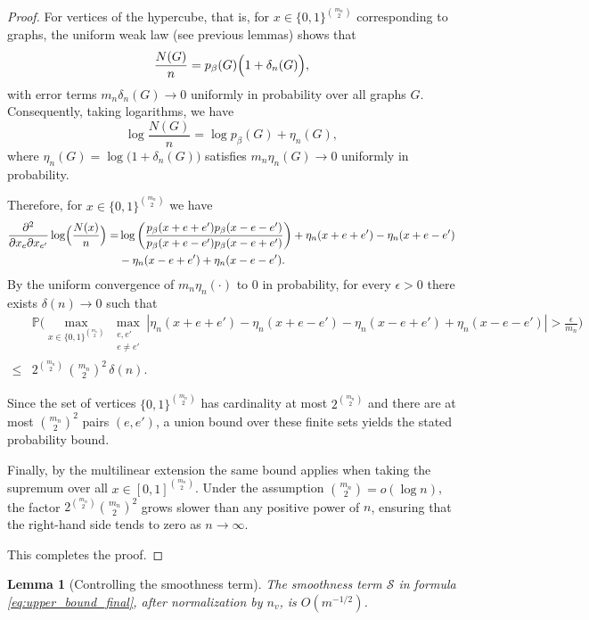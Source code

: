 \documentclass[12pt]{article}
\numberwithin{equation}{section}
\newtheorem{lemma}{Lemma}[section]
\begin{document}
\begin{proof}
For vertices of the hypercube, that is, for \(x\in\{0,1\}^{\binom{m_n}{2}}\) corresponding to graphs, the uniform weak law (see previous lemmas) shows that
\[
\frac{N(G)}{n} = p_{\beta}(G)\Bigl(1+\delta_n(G)\Bigr),
\]
with error terms \(m_n\delta_n(G)\to 0\) uniformly in probability over all graphs \(G\). Consequently, taking logarithms, we have
\[
\log\frac{N(G)}{n} = \log p_{\beta}(G) + \eta_n(G),
\]
where \(\eta_n(G)=\log\bigl(1+\delta_n(G)\bigr)\) satisfies \(m_n\eta_n(G)\to 0\) uniformly in probability.

Therefore, for \(x\in\{0,1\}^{\binom{m_n}{2}}\) we have
\begin{align*}
\frac{\partial^2}{\partial x_e\partial x_{e'}} \log\Bigl(\frac{N(x)}{n}\Bigr)
= &\log\left(\frac{p_{\beta}(x + e + e')p_{\beta}(x - e - e')}{p_{\beta}(x + e - e')p_{\beta}(x - e + e')}\right) + \eta_n(x+e+e') - \eta_n(x+e-e')\\
&- \eta_n(x-e+e') + \eta_n(x-e-e').
\end{align*}
By the uniform convergence of \(m_n\eta_n(\cdot)\) to 0 in probability, for every \(\epsilon>0\) there exists \(\delta(n)\to 0\) such that
\begin{align*}
&\mathbb{P}\Biggl(\max_{x\in \{0,1\}^{\binom{m_n}{2}}}\, \max_{\substack{e,e'\\e\neq e'}} \left|\eta_n(x+e+e') - \eta_n(x+e-e') - \eta_n(x-e+e') + \eta_n(x-e-e')\right| > \frac{\epsilon}{m_n}\Biggr)\\
\le &2^{\binom{m_n}{2}}\,\binom{m_n}{2}^2\, \delta(n).
\end{align*}

Since the set of vertices \(\{0,1\}^{\binom{m_n}{2}}\) has cardinality at most \(2^{\binom{m_n}{2}}\) and there are at most \(\binom{m_n}{2}^2\) pairs \((e,e')\), a union bound over these finite sets yields the stated probability bound.

Finally, by the multilinear extension the same bound applies when taking the supremum over all \(x\in [0,1]^{\binom{m_n}{2}}\). Under the assumption \(\binom{m_n}{2}=o(\log n)\), the factor \(2^{\binom{m_n}{2}}\binom{m_n}{2}^2\) grows slower than any positive power of \(n\), ensuring that the right-hand side tends to zero as \(n\to\infty\).

This completes the proof.
\end{proof}
 
\begin{lemma}[Controlling the smoothness term]\label{smoothness}
The smoothness term $\mathcal{S}$ in formula \eqref{eq:upper_bound_final}, after normalization by $n_v$, is $O(m^{-1/2})$.
\end{lemma}
\end{document}
